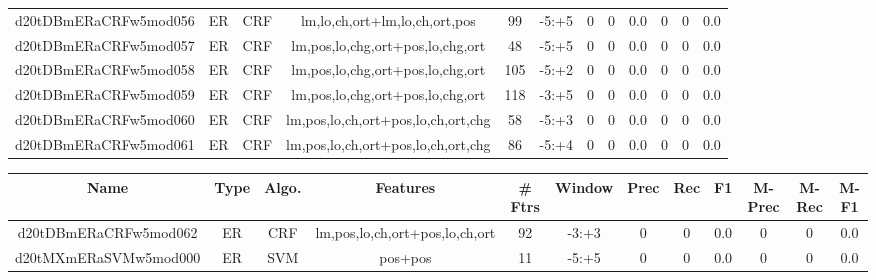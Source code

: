 \documentclass[a4paper]{article}
\begin{document}
\begin{landscape}
\begin{center}
\begin{tabular}{ |c|c|c|c|c|c|c|c|c|c|c|c|}
 
 	
 	\small{ d20tDBmERaCRFw5mod056 } & ER & CRF & lm,lo,ch,ort+lm,lo,ch,ort,pos  &  99 &  -5:+5  &  0 & 0 & 0.0  &  0 & 0 & 0.0 \\
 	

 
 	
 	\small{ d20tDBmERaCRFw5mod057 } & ER & CRF & lm,pos,lo,chg,ort+pos,lo,chg,ort  &  48 &  -5:+5  &  0 & 0 & 0.0  &  0 & 0 & 0.0 \\
 	

 
 	
 	\small{ d20tDBmERaCRFw5mod058 } & ER & CRF & lm,pos,lo,chg,ort+pos,lo,chg,ort  &  105 &  -5:+2  &  0 & 0 & 0.0  &  0 & 0 & 0.0 \\
 	

 
 	
 	\small{ d20tDBmERaCRFw5mod059 } & ER & CRF & lm,pos,lo,chg,ort+pos,lo,chg,ort  &  118 &  -3:+5  &  0 & 0 & 0.0  &  0 & 0 & 0.0 \\
 	

 
 	
 	\small{ d20tDBmERaCRFw5mod060 } & ER & CRF & lm,pos,lo,ch,ort+pos,lo,ch,ort,chg  &  58 &  -5:+3  &  0 & 0 & 0.0  &  0 & 0 & 0.0 \\
 	

 
 	
 	\small{ d20tDBmERaCRFw5mod061 } & ER & CRF & lm,pos,lo,ch,ort+pos,lo,ch,ort,chg  &  86 &  -5:+4  &  0 & 0 & 0.0  &  0 & 0 & 0.0 \\
 	
 \hline
\end{tabular}
\end{center}




\begin{center}
\begin{tabular}{ |c|c|c|c|c|c|c|c|c|c|c|c|} 
 \hline
 	Name & Type & Algo. & Features & \# Ftrs & Window & Prec & Rec & F1 & M-Prec & M-Rec & M-F1\\
 \hline

 	

 
 	
 	\small{ d20tDBmERaCRFw5mod062 } & ER & CRF & lm,pos,lo,ch,ort+pos,lo,ch,ort  &  92 &  -3:+3  &  0 & 0 & 0.0  &  0 & 0 & 0.0 \\
 	

 
 	
 	\small{ d20tMXmERaSVMw5mod000 } & ER & SVM & pos+pos  &  11 &  -5:+5  &  0 & 0 & 0.0  &  0 & 0 & 0.0 \\
 	


\end{tabular}
\end{center}
\end{landscape}
\end{document}
